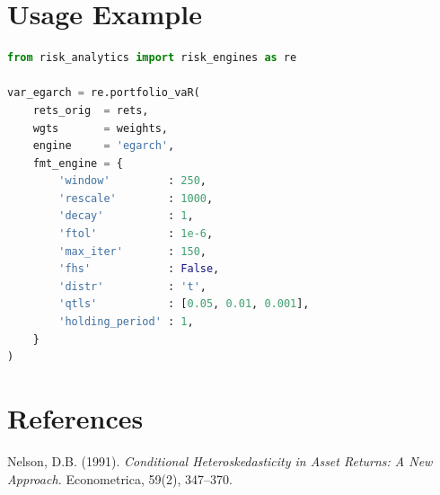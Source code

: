 \documentclass[11pt, a4paper]{article}
\begin{document}
\section{Usage Example}

\begin{lstlisting}[language=Python]
from risk_analytics import risk_engines as re

var_egarch = re.portfolio_vaR(
    rets_orig  = rets,
    wgts       = weights,
    engine     = 'egarch',
    fmt_engine = {
        'window'         : 250,
        'rescale'        : 1000,
        'decay'          : 1,
        'ftol'           : 1e-6,
        'max_iter'       : 150,
        'fhs'            : False,
        'distr'          : 't',
        'qtls'           : [0.05, 0.01, 0.001],
        'holding_period' : 1,
    }
)
\end{lstlisting}

\section{References}

Nelson, D.B. (1991).
\textit{Conditional Heteroskedasticity in Asset Returns: A New Approach.}
Econometrica, 59(2), 347--370.
\end{document}
